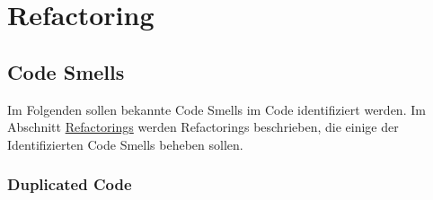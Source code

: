 \chapter{Refactoring}

\section{Code Smells} 

Im Folgenden sollen bekannte Code Smells im Code identifiziert werden. Im Abschnitt \hyperref[sec:Refactorings]{Refactorings} werden Refactorings beschrieben, die einige der Identifizierten Code Smells beheben sollen.


\subsection{Duplicated Code}
\label{sec:Duplicated_Code}

